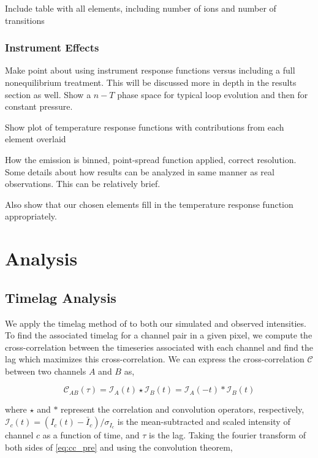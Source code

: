 \documentclass[preprint,linenumbers]{aastex62}
\begin{document}
Include table with all elements, including number of ions and number of transitions

\subsubsection{Instrument Effects}
\label{instrument}

Make point about using instrument response functions versus including a full nonequilibrium treatment. This will be discussed more in depth in the results section as well. Show a $n-T$ phase space for typical loop evolution and then for constant pressure.

Show plot of temperature response functions with contributions from each element overlaid

How the emission is binned, point-spread function applied, correct resolution. Some details about how results can be analyzed in same manner as real observations. This can be relatively brief.

Also show that our chosen elements fill in the temperature response function appropriately.

\section{Analysis}
\label{analysis}


\subsection{Timelag Analysis}
\label{timelag_analysis}

We apply the timelag method of \citet{viall_evidence_2012} to both our simulated and observed intensities. To find the associated timelag for a channel pair in a given pixel, we compute the cross-correlation between the timeseries associated with each channel and find the lag which maximizes this cross-correlation. We can express the cross-correlation $\mathcal{C}$ between two channels $A$ and $B$ as,

\begin{equation}\label{eq:cc_pre}
    \mathcal{C}_{AB}(\tau) = \mathcal{I}_A(t)\star\mathcal{I}_B(t) = \mathcal{I}_A(-t)\ast\mathcal{I}_B(t)
\end{equation}

where $\star$ and $\ast$ represent the correlation and convolution operators, respectively, $\mathcal{I}_c(t)=(I_c(t)-\bar{I}_c)/\sigma_{I_c}$ is the mean-subtracted and scaled intensity of channel $c$ as a function of time, and $\tau$ is the lag. Taking the fourier transform of both sides of \autoref{eq:cc_pre} and using the convolution theorem,
\end{document}
